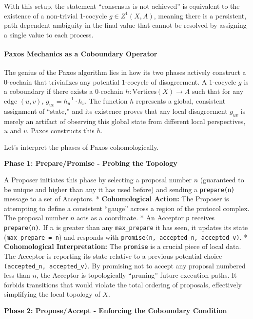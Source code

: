 \documentclass[
]{article}
\begin{document}
With this setup, the statement ``consensus is not achieved'' is
equivalent to the existence of a non-trivial 1-cocycle
\(g \in Z^1(X, A)\), meaning there is a persistent, path-dependent
ambiguity in the final value that cannot be resolved by assigning a
single value to each process.

\paragraph{Paxos Mechanics as a Coboundary
Operator}\label{paxos-mechanics-as-a-coboundary-operator}

The genius of the Paxos algorithm lies in how its two phases actively
construct a 0-cochain that trivializes any potential 1-cocycle of
disagreement. A 1-cocycle \(g\) is a coboundary if there exists a
0-cochain \(h: \text{Vertices}(X) \to A\) such that for any edge
\((u,v)\), \(g_{uv} = h_u^{-1} \cdot h_v\). The function \(h\)
represents a global, consistent assignment of ``state,'' and its
existence proves that any local disagreement \(g_{uv}\) is merely an
artifact of observing this global state from different local
perspectives, \(u\) and \(v\). Paxos constructs this \(h\).

Let's interpret the phases of Paxos cohomologically.

\textbf{Phase 1: Prepare/Promise - Probing the Topology}

A Proposer initiates this phase by selecting a proposal number \(n\)
(guaranteed to be unique and higher than any it has used before) and
sending a \texttt{prepare(n)} message to a set of Acceptors. *
\textbf{Cohomological Action:} The Proposer is attempting to define a
consistent ``gauge'' across a region of the protocol complex. The
proposal number \(n\) acts as a coordinate. * An Acceptor \texttt{p}
receives \texttt{prepare(n)}. If \(n\) is greater than any
\texttt{max\_prepare} it has seen, it updates its state
(\texttt{max\_prepare\ =\ n}) and responds with
\texttt{promise(n,\ accepted\_n,\ accepted\_v)}. * \textbf{Cohomological
Interpretation:} The \texttt{promise} is a crucial piece of local data.
The Acceptor is reporting its state relative to a previous potential
choice \texttt{(accepted\_n,\ accepted\_v)}. By promising not to accept
any proposal numbered less than \(n\), the Acceptor is topologically
``pruning'' future execution paths. It forbids transitions that would
violate the total ordering of proposals, effectively simplifying the
local topology of \(X\).

\textbf{Phase 2: Propose/Accept - Enforcing the Coboundary Condition}
\end{document}
